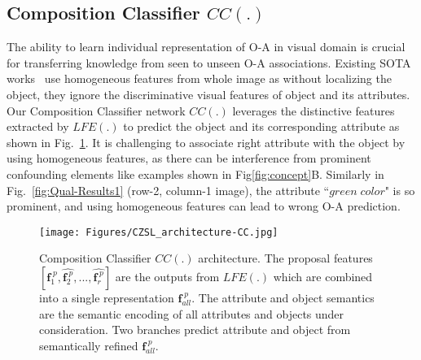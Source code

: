 \documentclass{bmvc2k}
\begin{document}
\vspace{-0.2cm}
\subsection{Composition Classifier $CC(.)$}\label{section:CCL}
\vspace{-0.15cm}
 The ability to learn individual representation of O-A in visual domain is crucial for transferring knowledge from seen to unseen O-A associations. Existing SOTA works~\cite{naeem2021learning,mancini2021learning,mancini2021open,ruis2021independent,xu2021zero} use homogeneous features from whole image as without localizing the object, they ignore the discriminative visual features of object and its attributes. Our Composition Classifier network $CC(.)$ leverages the distinctive features extracted by $LFE(.)$ to predict the object and its corresponding attribute as shown in Fig.~\ref{fig:CC}.
 It is challenging to associate right attribute with the object by using homogeneous features, as there can be interference from prominent confounding elements like examples shown in Fig\ref{fig:concept}B. Similarly in Fig.~\ref{fig:Qual-Results1} (row-2, column-1 image), the attribute ``$green\; color$" is so prominent, and using homogeneous features can lead to wrong O-A prediction.
\begin{figure}
    \centering
    \texttt{[image: Figures/CZSL\_architecture-CC.jpg]}
    \vspace{-0.2cm}
    \caption{Composition Classifier $CC(.)$ architecture. The proposal features $[\hat{\textbf{f}^{\;p}_1}, \hat{\textbf{f}^{\;p}_2}, ..., \hat{\textbf{f}^{\;p}_r}]$ are the outputs from $LFE(.)$ which are combined into a single representation $\textbf{f}^{\;p}_{all}$. The attribute and object semantics are the semantic encoding of all attributes and objects under consideration. Two branches predict attribute and object from semantically refined $\textbf{f}^{\;p}_{all}$.}
    \vspace{-0.4cm}
    \label{fig:CC}
\end{figure}
\end{document}
